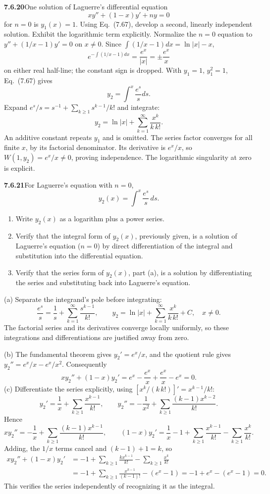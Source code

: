 \par\bigskip
\noindent\textbf{7.6.20}\quad One solution of Laguerre's differential equation
\[
xy''+(1-x)y'+ny=0
\]
for $n=0$ is $y_{1}(x)=1$. Using Eq.~(7.67), develop a second, linearly
independent solution. Exhibit the logarithmic term explicitly.
\solution
Normalize the $n=0$ equation to $y''+(1/x-1)y'=0$ on $x\ne0$.
Since $\int(1/x-1)dx=\ln|x|-x$,
\[
e^{-\int(1/x-1)dx}=\frac{e^x}{|x|}=\pm\frac{e^x}{x}
\]
on either real half-line; the constant sign is dropped. With $y_1=1$,
$y_1^2=1$, Eq.~(7.67) gives
\[
y_2=\int^x\frac{e^s}{s}ds.
\]
Expand $e^s/s=s^{-1}+\sum_{k\ge1}s^{k-1}/k!$ and integrate:
\[
\boxed{y_2=\ln|x|+\sum_{k=1}^\infty\frac{x^k}{k\,k!}}.
\]
An additive constant repeats $y_1$ and is omitted. The series factor
converges for all finite $x$, by its factorial denominator.
Its derivative is $e^x/x$, so $W(1,y_2)=e^x/x\ne0$, proving
independence. The logarithmic singularity at zero is explicit.

\par\bigskip
\noindent\textbf{7.6.21}\quad For Laguerre's equation with $n=0$,
\[
y_{2}(x)=\int^{x}\frac{e^{s}}{s}\,ds.
\]
\begin{enumerate}
\item[(a)] Write $y_{2}(x)$ as a logarithm plus a power series.
\item[(b)] Verify that the integral form of $y_{2}(x)$, previously given, is a
  solution of Laguerre's equation ($n=0$) by direct differentiation of the
  integral and substitution into the differential equation.
\item[(c)] Verify that the series form of $y_{2}(x)$, part (a), is a solution
  by differentiating the series and substituting back into Laguerre's
  equation.
\end{enumerate}
\solution
(a) Separate the integrand's pole before integrating:
\[
\frac{e^s}s=\frac1s+\sum_{k=1}^\infty\frac{s^{k-1}}{k!},
\qquad
\boxed{y_2=\ln|x|+\sum_{k=1}^\infty\frac{x^k}{k\,k!}+C},\quad x\ne0.
\]
The factorial series and its derivatives converge locally uniformly,
so these integrations and differentiations are justified away from zero.

(b) The fundamental theorem gives $y_2'=e^x/x$, and the quotient rule
gives $y_2''=e^x/x-e^x/x^2$. Consequently
\[
xy_2''+(1-x)y_2'
=e^x-\frac{e^x}x+\frac{e^x}x-e^x=0.
\]
(c) Differentiate the series explicitly, using
$[x^k/(k\,k!)]'=x^{k-1}/k!$:
\[
y_2'=\frac1x+\sum_{k\ge1}\frac{x^{k-1}}{k!},\qquad
y_2''=-\frac1{x^2}+\sum_{k\ge1}\frac{(k-1)x^{k-2}}{k!}.
\]
Hence
\[
xy_2''=-\frac1x+\sum_{k\ge1}\frac{(k-1)x^{k-1}}{k!},\qquad
(1-x)y_2'=\frac1x-1+\sum_{k\ge1}\frac{x^{k-1}}{k!}
 -\sum_{k\ge1}\frac{x^k}{k!}.
\]
Adding, the $1/x$ terms cancel and $(k-1)+1=k$, so
\begin{align*}
xy_2''+(1-x)y_2'
&=-1+\sum_{k\ge1}\frac{kx^{k-1}}{k!}
      -\sum_{k\ge1}\frac{x^k}{k!}\\
&=-1+\sum_{k\ge1}\frac{x^{k-1}}{(k-1)!}-(e^x-1)
=-1+e^x-(e^x-1)=0.
\end{align*}
This verifies the series independently of recognizing it as the integral.

